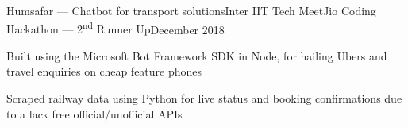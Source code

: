 \documentclass[letterpaper,10pt]{resume}
\begin{document}
\begin{rSubsection}{Humsafar --- Chatbot for transport solutions}{Inter IIT Tech Meet}{Jio Coding Hackathon --- 2\textsuperscript{nd} Runner Up}{December 2018}
	\item Built using the Microsoft Bot Framework SDK in Node, for hailing Ubers and travel enquiries on cheap feature phones
	\item Scraped railway data using Python for live status and booking confirmations due to a lack free official/unofficial APIs
\end{rSubsection}



%
%
\end{document}
